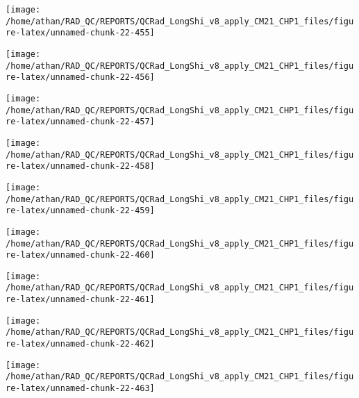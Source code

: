 \documentclass[
  10pt,
  a4paper,oneside]{article}
\begin{document}
\begin{center}\texttt{[image: /home/athan/RAD\_QC/REPORTS/QCRad\_LongShi\_v8\_apply\_CM21\_CHP1\_files/figure-latex/unnamed-chunk-22-455]} \end{center}

\begin{center}\texttt{[image: /home/athan/RAD\_QC/REPORTS/QCRad\_LongShi\_v8\_apply\_CM21\_CHP1\_files/figure-latex/unnamed-chunk-22-456]} \end{center}

\begin{center}\texttt{[image: /home/athan/RAD\_QC/REPORTS/QCRad\_LongShi\_v8\_apply\_CM21\_CHP1\_files/figure-latex/unnamed-chunk-22-457]} \end{center}

\begin{center}\texttt{[image: /home/athan/RAD\_QC/REPORTS/QCRad\_LongShi\_v8\_apply\_CM21\_CHP1\_files/figure-latex/unnamed-chunk-22-458]} \end{center}

\begin{center}\texttt{[image: /home/athan/RAD\_QC/REPORTS/QCRad\_LongShi\_v8\_apply\_CM21\_CHP1\_files/figure-latex/unnamed-chunk-22-459]} \end{center}

\begin{center}\texttt{[image: /home/athan/RAD\_QC/REPORTS/QCRad\_LongShi\_v8\_apply\_CM21\_CHP1\_files/figure-latex/unnamed-chunk-22-460]} \end{center}

\begin{center}\texttt{[image: /home/athan/RAD\_QC/REPORTS/QCRad\_LongShi\_v8\_apply\_CM21\_CHP1\_files/figure-latex/unnamed-chunk-22-461]} \end{center}

\begin{center}\texttt{[image: /home/athan/RAD\_QC/REPORTS/QCRad\_LongShi\_v8\_apply\_CM21\_CHP1\_files/figure-latex/unnamed-chunk-22-462]} \end{center}

\begin{center}\texttt{[image: /home/athan/RAD\_QC/REPORTS/QCRad\_LongShi\_v8\_apply\_CM21\_CHP1\_files/figure-latex/unnamed-chunk-22-463]} \end{center}
\end{document}
